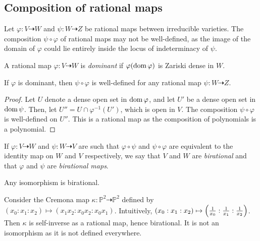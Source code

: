 \subsection{Composition of rational maps}
Let \( \varphi \colon V \dashrightarrow W \) and \( \psi \colon W \dashrightarrow Z \) be rational maps between irreducible varieties.
The composition \( \psi \circ \varphi \) of rational maps may not be well-defined, as the image of the domain of \( \varphi \) could lie entirely inside the locus of indeterminacy of \( \psi \).
\begin{definition}
    A rational map \( \varphi \colon V \dashrightarrow W \) is \emph{dominant} if \( \varphi(\operatorname{dom} \varphi) \) is Zariski dense in \( W \).
\end{definition}
\begin{proposition}
    If \( \varphi \) is dominant, then \( \psi \circ \varphi \) is well-defined for any rational map \( \psi \colon W \dashrightarrow Z \).
\end{proposition}
\begin{proof}
    Let \( U \) denote a dense open set in \( \operatorname{dom} \varphi \), and let \( U' \) be a dense open set in \( \operatorname{dom} \psi \).
    Then, let \( U'' = U \cap \varphi^{-1}(U') \), which is open in \( V \).
    The composition \( \psi \circ \varphi \) is well-defined on \( U'' \).
    This is a rational map as the composition of polynomials is a polynomial.
\end{proof}
\begin{definition}
    If \( \varphi \colon V \dashrightarrow W \) and \( \psi \colon W \dashrightarrow V \) are such that \( \varphi \circ \psi \) and \( \psi \circ \varphi \) are equivalent to the identity map on \( W \) and \( V \) respectively, we say that \( V \) and \( W \) are \emph{birational} and that \( \varphi \) and \( \psi \) are \emph{birational maps}.
\end{definition}
\begin{example}
    Any isomorphism is birational.
\end{example}
\begin{example}
    Consider the Cremona map \( \kappa \colon \mathbb P^2 \dashrightarrow \mathbb P^2 \) defined by \( (x_0 : x_1 : x_2) \mapsto (x_1 x_2 : x_0 x_2 : x_0 x_1) \).
    Intuitively, \( (x_0 : x_1 : x_2) \mapsto \qty(\frac{1}{x_0} : \frac{1}{x_1} : \frac{1}{x_2}) \).
    Then \( \kappa \) is self-inverse as a rational map, hence birational.
    It is not an isomorphism as it is not defined everywhere.
\end{example}
